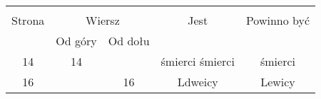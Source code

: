 \documentclass[a4paper,11pt]{article}
\begin{document}
\begin{center}
  \begin{tabular}{|c|c|c|c|c|}
    \hline
    & \multicolumn{2}{c|}{} & & \\
    Strona & \multicolumn{2}{c|}{Wiersz} & Jest
                              & Powinno być \\ \cline{2-3}
    & Od góry & Od dołu & & \\
    \hline
    14  & 14 & & śmierci śmierci & śmierci \\
    16  & & 16 & Ldweicy & Lewicy \\
    \hline
  \end{tabular}


\end{center}
\end{document}
